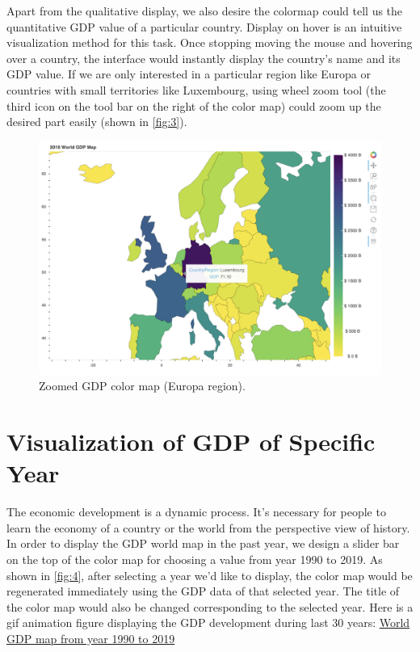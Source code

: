 \documentclass{vgtc}                          %
\begin{document}
Apart from the qualitative display, we also desire the colormap could tell us the quantitative GDP value of a particular country. Display on hover is an intuitive visualization method for this task. Once stopping moving the mouse and hovering over a country, the interface would instantly display the country's name and its GDP value. If we are only interested in a particular region like Europa or countries with small territories like Luxembourg, using wheel zoom tool (the third icon on the tool bar on the right of the color map) could zoom up the desired part easily (shown in \autoref{fig:3}). 


\begin{figure}[tb]
  \centering 
  \includegraphics[width=\columnwidth]{gdp_fig5.png}
  \caption{Zoomed GDP color map (Europa region).}
  \label{fig:3}
\end{figure}

\section{Visualization of GDP of Specific Year}
The economic development is a dynamic process. It's necessary for people to learn the economy of a country or the world from the perspective view of history. In order to display the GDP world map in the past year, we design a slider bar on the top of the color map for choosing a value from year 1990 to 2019. As shown in \autoref{fig:4}, after selecting a year we'd like to display, the color map would be regenerated immediately using the GDP data of that selected year. The title of the color map would also be changed corresponding to the selected year. Here is a gif animation figure displaying the GDP development during last 30 years: \textcolor{blue}{\href{https://i.imgur.com/lB4Xoz7.gif}{World GDP map from year 1990 to 2019}}
\end{document}
